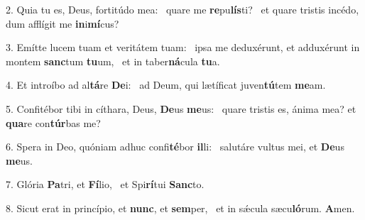 2. Quia tu es, Deus, fortitúdo mea: \dag\  quare me \textbf{re}pu\textbf{lís}ti? \ast\  et quare tristis incédo, dum afflígit me \textbf{in}i\textbf{mí}cus?\

3. Emítte lucem tuam et veritátem tuam: \dag\  ipsa me deduxérunt, et adduxérunt in montem \textbf{sanc}tum \textbf{tu}um, \ast\  et in taber\textbf{ná}cula \textbf{tu}a.\

4. Et introíbo ad al\textbf{tá}re \textbf{De}i: \ast\  ad Deum, qui lætíficat juven\textbf{tú}tem \textbf{me}am.\

5. Confitébor tibi in cíthara, Deus, \textbf{De}us \textbf{me}us: \ast\  quare tristis es, ánima mea? et \textbf{qua}re con\textbf{túr}bas me?\

6. Spera in Deo, quóniam adhuc confi\textbf{té}bor \textbf{il}li: \ast\  salutáre vultus mei, et \textbf{De}us \textbf{me}us.\

7. Glória \textbf{Pa}tri, et \textbf{Fí}lio, \ast\  et Spi\textbf{rí}tui \textbf{Sanc}to.\

8. Sicut erat in princípio, et \textbf{nunc}, et \textbf{sem}per, \ast\  et in sǽcula sæcu\textbf{ló}rum. \textbf{A}men.\

